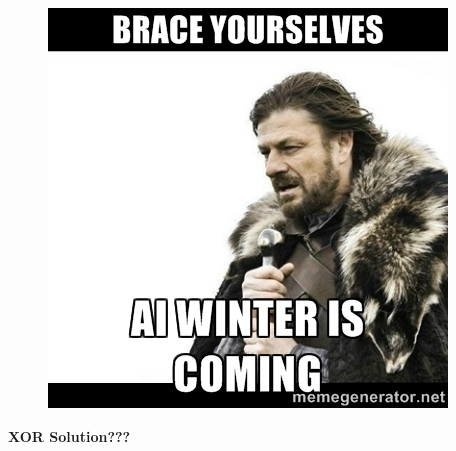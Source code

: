 \documentclass[10pt, compress]{beamer}
\begin{document}
\begin{frame}
  \vspace{.5cm}
  \begin{figure}
    \includegraphics[width=.7\linewidth]{imgs/ai_winter}
  \end{figure}
\end{frame}

\begin{frame}
  \vspace{.5cm}
  \centering
  \textbf{\Large{XOR Solution???}}
\end{frame}
\end{document}
